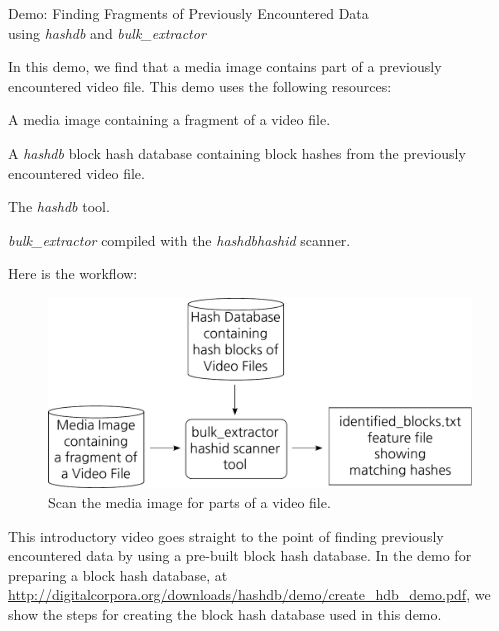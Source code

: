 \documentclass[12pt,twoside]{article}
\newcommand{\hdb}{\emph{hashdb}\xspace}
\newcommand{\bulk}{\emph{bulk\_extractor}\xspace}
\newcommand{\hashid}{\emph{hashid}\xspace}
\begin{document}
\begin{center}
\Large Demo: Finding Fragments of Previously Encountered Data \\
\large using \hdb and \bulk
\end{center}

In this demo, we find that a media image contains part of a
previously encountered video file.
This demo uses the following resources:
\begin{compactitem}
\item A media image containing a fragment of a video file.
\item A \hdb block hash database containing block hashes
from the previously encountered video file.
\item The \hdb tool.
\item \bulk compiled with the \hdb \hashid scanner.
\end{compactitem}

Here is the workflow:

\begin{figure}[H]
  \center
  \includegraphics[scale=0.6]{drawings/scan_hashid}
  \caption*{Scan the media image for parts of a video file.}
  \label{fig:scan_hashid}
\end{figure}

This introductory video goes straight to the point of finding
previously encountered data by using a pre-built block hash database.
In the demo for preparing a block hash database, at
\url{http://digitalcorpora.org/downloads/hashdb/demo/create\_hdb\_demo.pdf},
we show the steps for creating the block hash database used in this demo.
\end{document}

